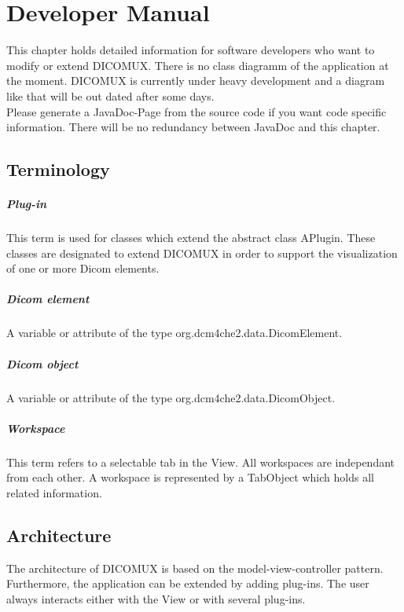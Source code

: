 %
%
\chapter{Developer Manual}
This chapter holds detailed information for software developers who want to modify or extend DICOMUX. There is no class diagramm of the application at the moment. DICOMUX is currently under heavy development and a diagram like that will be out dated after some days.\\
Please generate a JavaDoc-Page from the source code if you want code specific information. There will be no redundancy between JavaDoc and this chapter.

\section{Terminology}
\paragraph{Plug-in}
This term is used for classes which extend the abstract class APlugin. These classes are designated to extend DICOMUX in order to support the visualization of one or more Dicom elements.
\paragraph{Dicom element}
A variable or attribute of the type org.dcm4che2.data.DicomElement.
\paragraph{Dicom object}
A variable or attribute of the type org.dcm4che2.data.DicomObject.
\paragraph{Workspace}
This term refers to a selectable tab in the View. All workspaces are independant from each other. A workspace is represented by a TabObject which holds all related information.

\section{Architecture}
The architecture of DICOMUX is based on the model-view-controller pattern. Furthermore, the application can be extended by adding plug-ins. The user always interacts either with the View or with several plug-ins.

